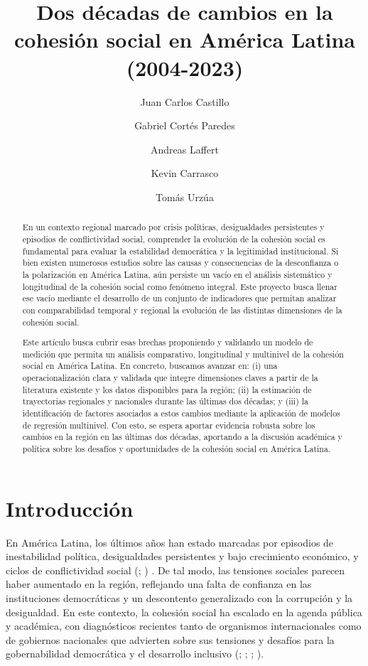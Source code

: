 \documentclass[
  spanish,
  letterpaper,
  DIV=11,
  numbers=noendperiod]{scrartcl}
\title{Dos décadas de cambios en la cohesión social en América Latina
(2004-2023)}
\author{Juan Carlos Castillo \and Gabriel Cortés Paredes \and Andreas
Laffert \and Kevin Carrasco \and Tomás Urzúa}
\date{}
\begin{document}
\maketitle
\begin{abstract}
En un contexto regional marcado por crisis políticas, desigualdades
persistentes y episodios de conflictividad social, comprender la
evolución de la cohesión social es fundamental para evaluar la
estabilidad democrática y la legitimidad institucional. Si bien existen
numerosos estudios sobre las causas y consecuencias de la desconfianza o
la polarización en América Latina, aún persiste un vacío en el análisis
sistemático y longitudinal de la cohesión social como fenómeno integral.
Este proyecto busca llenar ese vacío mediante el desarrollo de un
conjunto de indicadores que permitan analizar con comparabilidad
temporal y regional la evolución de las distintas dimensiones de la
cohesión social.

Este artículo busca cubrir esas brechas proponiendo y validando un
modelo de medición que permita un análisis comparativo, longitudinal y
multinivel de la cohesión social en América Latina. En concreto,
buscamos avanzar en: (i) una operacionalización clara y validada que
integre dimensiones claves a partir de la literatura existente y los
datos disponibles para la región; (ii) la estimación de trayectorias
regionales y nacionales durante las últimas dos décadas; y (iii) la
identificación de factores asociados a estos cambios mediante la
aplicación de modelos de regresión multinivel. Con esto, se espera
aportar evidencia robusta sobre los cambios en la región en las últimas
dos décadas, aportando a la discusión académica y política sobre los
desafíos y oportunidades de la cohesión social en América Latina.
\end{abstract}


\section{Introducción}\label{introducciuxf3n}

En América Latina, los últimos años han estado marcadas por episodios de
inestabilidad política, desigualdades persistentes y bajo crecimiento
económico, y ciclos de conflictividad social
(; ) . De tal modo, las tensiones sociales parecen haber aumentado en
la región, reflejando una falta de confianza en las instituciones
democráticas y un descontento generalizado con la corrupción y la
desigualdad. En este contexto, la cohesión social ha escalado en la
agenda pública y académica, con diagnósticos recientes tanto de
organismos internacionales como de gobiernos nacionales que advierten
sobre sus tensiones y desafíos para la gobernabilidad democrática y el
desarrollo inclusivo (;
;
; ).
\end{document}
